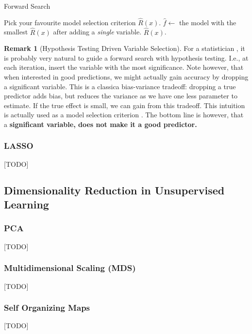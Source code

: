 \documentclass[12pt,a4paper]{article}
\theoremstyle{plain}
\theoremstyle{definition}
\newtheorem{remark}{Remark}
\newcommand{\risk}{R}
\newcommand{\hyp}{f}
\begin{document}
\begin{algorithm}[H]
\caption{Forward Search}
\begin{algorithmic}
\State Pick your favourite model selection criterion $\hat{\risk}(x)$.
\While{$\hat{\risk}(x)$ keeps getting smaller}
    \State $\hat{\hyp} \gets$ the model with the smallest $\hat{\risk}(x)$ after adding a \emph{single} variable.
\EndWhile
\State \Return $\hat{\risk}(x)$.
\end{algorithmic}
\end{algorithm}



\begin{remark}[Hypothesis Testing Driven Variable Selection]
For a statistician , it is probably very natural to guide a forward search with hypothesis testing. I.e., at each iteration, insert the variable with the most significance. 
Note however, that when interested in good predictions, we might actually gain accuracy by dropping a significant variable. This is a classica bias-variance tradeoff: dropping a true predictor adds bias, but reduces the variance as we have one less parameter to estimate. If the true effect is small, we can gain from this tradeoff. 
This intuition is actually used as a model selection criterion \citep{foster_variable_2004}.
The bottom line is however, that a \textbf{significant variable, does not make it a good predictor.} 
\end{remark}

\subsubsection{LASSO}
[TODO]


\subsection{Dimensionality Reduction in Unsupervised Learning}
\label{sec:dim_reduce_unsupervised}


\subsubsection{PCA}
[TODO]

\subsubsection{Multidimensional Scaling (MDS)}
[TODO]


\subsubsection{Self Organizing Maps}
[TODO]
\end{document}
